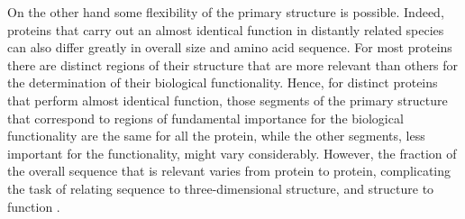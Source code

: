 On the other hand some flexibility of the primary structure is possible. Indeed, proteins that carry out an almost identical function in distantly related species can also differ greatly in overall size and amino acid sequence. For most proteins 
there are distinct regions of their structure that are more relevant than others for the determination of their biological functionality. Hence, for distinct proteins that perform almost identical function, those segments of the primary structure that correspond to regions of fundamental importance for the biological functionality are the same for all the protein, while the other segments, less important for the functionality, might vary considerably. However, the fraction of the overall sequence that is relevant varies from protein to protein, complicating the task of relating sequence to three-dimensional structure, and structure to function
\cite{nelson2008lehninger}.\\


